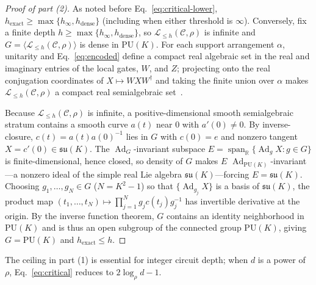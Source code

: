 \documentclass[aps,prl,reprint,notitlepage,nofootinbib,nobibnotes]{revtex4-2}
\newcommand{\PU}{\mathrm{PU}}
\begin{document}
\begin{proof}[Proof of part (2)]
As noted before Eq.~\eqref{eq:critical-lower}, \(h_{\mathrm{exact}}\ge\max\{h_\infty,h_{\mathrm{dense}}\}\) (including when either threshold is \(\infty\)). Conversely, fix a finite depth \(h\ge\max\{h_\infty,h_{\mathrm{dense}}\}\), so \(\mathcal L_{\le h}(\mathcal C,\rho)\) is infinite and \(G=\langle\mathcal L_{\le h}(\mathcal C,\rho)\rangle\) is dense in \(\PU(K)\). For each support arrangement \(\alpha\), unitarity and Eq.~\eqref{eq:encoded} define a compact real algebraic set in the real and imaginary entries of the local gates, \(W\), and \(Z\); projecting onto the real conjugation coordinates of \(X\mapsto WXW^\dagger\) and taking the finite union over \(\alpha\) makes \(\mathcal L_{\le h}(\mathcal C,\rho)\) a compact real semialgebraic set~\cite{BasuPollackRoy}.

Because \(\mathcal L_{\le h}(\mathcal C,\rho)\) is infinite, a positive-dimensional smooth semialgebraic stratum contains a smooth curve \(a(t)\) near \(0\) with \(a'(0)\ne0\). By inverse-closure, \(c(t)=a(t)a(0)^{-1}\) lies in \(G\) with \(c(0)=e\) and nonzero tangent \(X=c'(0)\in\mathfrak{su}(K)\). The \(\operatorname{Ad}_G\)-invariant subspace \(E=\operatorname{span}_{\mathbb R}\{\operatorname{Ad}_g X:g\in G\}\) is finite-dimensional, hence closed, so density of \(G\) makes \(E\) \(\operatorname{Ad}_{\PU(K)}\)-invariant---a nonzero ideal of the simple real Lie algebra \(\mathfrak{su}(K)\)---forcing \(E=\mathfrak{su}(K)\). Choosing \(g_1,\ldots,g_N\in G\) (\(N=K^2-1\)) so that \(\{\operatorname{Ad}_{g_j}X\}\) is a basis of \(\mathfrak{su}(K)\), the product map \((t_1,\ldots,t_N)\mapsto\prod_{j=1}^N g_jc(t_j)g_j^{-1}\) has invertible derivative at the origin. By the inverse function theorem, \(G\) contains an identity neighborhood in \(\PU(K)\) and is thus an open subgroup of the connected group \(\PU(K)\), giving \(G=\PU(K)\) and \(h_{\mathrm{exact}}\le h\).
\end{proof}

The ceiling in part (1) is essential for integer circuit depth; when \(d\) is a power of \(\rho\), Eq.~\eqref{eq:critical} reduces to \(2\log_\rho d-1\).
\end{document}
